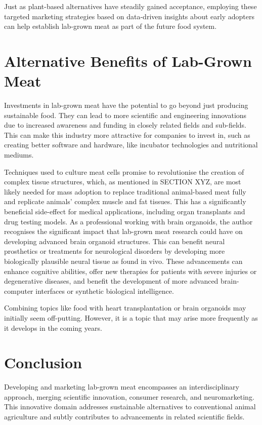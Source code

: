 \documentclass[10pt]{article}
\begin{document}
\begin{sloppypar}
  Just as plant-based alternatives have steadily gained acceptance, employing these targeted marketing strategies based on data-driven insights about early adopters can help establish lab-grown meat as part of the future food system.

  \section{Alternative Benefits of Lab-Grown Meat}
  \label{sec:alternative-benefits}

  Investments in lab-grown meat have the potential to go beyond just producing sustainable food. They can lead to more scientific and engineering innovations due to increased awareness and funding in closely related fields and sub-fields. This can make this industry more attractive for companies to invest in, such as creating better software and hardware, like incubator technologies and nutritional mediums.



  Techniques used to culture meat cells promise to revolutionise the creation of complex tissue structures, which, as mentioned in SECTION XYZ, are most likely needed for mass adoption to replace traditional animal-based meat fully and replicate animals’ complex muscle and fat tissues. This has a significantly beneficial side-effect for medical applications, including organ transplants and drug testing models. As a professional working with brain organoids, the author recognises the significant impact that lab-grown meat research could have on developing advanced brain organoid structures. This can benefit neural prosthetics or treatments for neurological disorders by developing more biologically plausible neural tissue as found in vivo. These advancements can enhance cognitive abilities, offer new therapies for patients with severe injuries or degenerative diseases, and benefit the development of more advanced brain-computer interfaces or synthetic biological intelligence.

  Combining topics like food with heart transplantation or brain organoids may initially seem off-putting. However, it is a topic that may arise more frequently as it develops in the coming years.

  \section{Conclusion}
  \label{sec:conclusion}
  Developing and marketing lab-grown meat encompasses an interdisciplinary approach, merging scientific innovation, consumer research, and neuromarketing. This innovative domain addresses sustainable alternatives to conventional animal agriculture and subtly contributes to advancements in related scientific fields.


\end{sloppypar}
\end{document}
